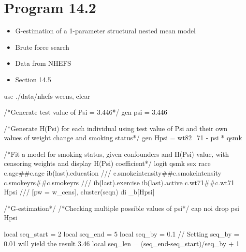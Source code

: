\documentclass[
  10pt,
  a4paper,
]{book}
\newenvironment{Shaded}{\begin{snugshade}}{\end{snugshade}}
\newcommand{\CommentTok}[1]{\textcolor[rgb]{0.37,0.37,0.37}{#1}}
\newcommand{\FunctionTok}[1]{\textcolor[rgb]{0.28,0.35,0.67}{#1}}
\newcommand{\KeywordTok}[1]{\textcolor[rgb]{0.00,0.46,0.62}{#1}}
\newcommand{\NormalTok}[1]{\textcolor[rgb]{0.00,0.46,0.62}{#1}}
\newcommand{\OtherTok}[1]{\textcolor[rgb]{0.00,0.46,0.62}{#1}}
\providecommand{\tightlist}{%
  \setlength{\itemsep}{0pt}\setlength{\parskip}{0pt}}
\begin{document}
\section{Program 14.2}\label{program-14.2-1}

\begin{itemize}
\tightlist
\item
  G-estimation of a 1-parameter structural nested mean model
\item
  Brute force search
\item
  Data from NHEFS
\item
  Section 14.5
\end{itemize}

\begin{Shaded}
\begin{Highlighting}[]
\KeywordTok{use}\NormalTok{ ./}\KeywordTok{data}\NormalTok{/nhefs{-}wcens, }\KeywordTok{clear}

\CommentTok{/*Generate test value of Psi = 3.446*/}
\KeywordTok{gen}\NormalTok{ psi = 3.446}

\CommentTok{/*Generate H(Psi) for each individual using test value of Psi and}
\CommentTok{their own values of weight change and smoking status*/}
\KeywordTok{gen}\NormalTok{ Hpsi = wt82\_71 {-} psi * qsmk }

\CommentTok{/*Fit a model for smoking status, given confounders and H(Psi) value, }
\CommentTok{with censoring weights and display H(Psi) coefficient*/}
\KeywordTok{logit}\NormalTok{ qsmk sex race c.age\#\#c.age ib(}\FunctionTok{last}\NormalTok{).education }\CommentTok{///}
\NormalTok{  c.smokeintensity\#\#c.smokeintensity c.smokeyrs\#\#c.smokeyrs }\CommentTok{///}
\NormalTok{  ib(}\FunctionTok{last}\NormalTok{).exercise ib(}\FunctionTok{last}\NormalTok{).active c.wt71\#\#c.wt71 Hpsi }\CommentTok{///}
\NormalTok{  [pw = w\_cens], }\KeywordTok{cluster}\NormalTok{(seqn)}
\KeywordTok{di}\NormalTok{ \_b[Hpsi]}

\CommentTok{/*G{-}estimation*/}
\CommentTok{/*Checking multiple possible values of psi*/}
\NormalTok{cap }\KeywordTok{noi} \KeywordTok{drop}\NormalTok{ psi Hpsi}

\KeywordTok{local}\NormalTok{ seq\_start = 2}
\KeywordTok{local}\NormalTok{ seq\_end = 5}
\KeywordTok{local}\NormalTok{ seq\_by = 0.1 }\CommentTok{// Setting seq\_by = 0.01 will yield the result 3.46}
\KeywordTok{local}\NormalTok{ seq\_len = (}\OtherTok{\textasciigrave{}seq\_end\textquotesingle{}}\NormalTok{{-}}\OtherTok{\textasciigrave{}seq\_start\textquotesingle{}}\NormalTok{)/}\OtherTok{\textasciigrave{}seq\_by\textquotesingle{}}\NormalTok{ + 1}
                 

\end{Highlighting}
\end{Shaded}
\end{document}
